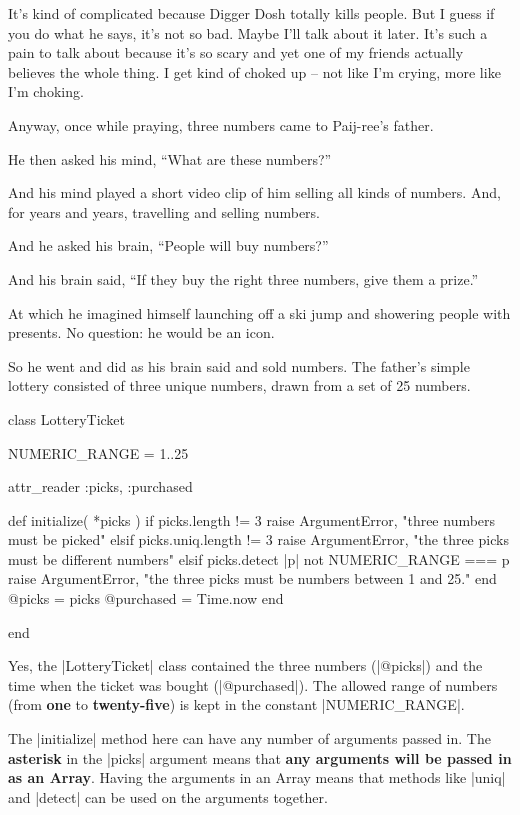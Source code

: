 \documentclass[12pt,twoside]{report}
\begin{document}
It's kind of complicated because Digger Dosh totally kills people.
But I guess if you do what he says, it's not so bad.  Maybe I'll talk
about it later.  It's such a pain to talk about because it's so scary
and yet one of my friends actually believes the whole thing.  I get
kind of choked up -- not like I'm crying, more like I'm choking.

Anyway, once while praying, three numbers came to Paij-ree's father.

He then asked his mind, ``What are these numbers?''

And his mind played a short video clip of him selling all kinds of
numbers.  And, for years and years, travelling and selling numbers.

And he asked his brain, ``People will buy numbers?''

And his brain said, ``If they buy the right three numbers, give them a
prize.''

At which he imagined himself launching off a ski jump and showering
people with presents.  No question: he would be an icon.

So he went and did as his brain said and sold numbers.  The father's
simple lottery consisted of three unique numbers, drawn from a set of
25 numbers.


\begin{rubycode}

 class LotteryTicket

   NUMERIC_RANGE = 1..25

   attr_reader :picks, :purchased

   def initialize( *picks )
     if picks.length != 3
       raise ArgumentError, "three numbers must be picked"
     elsif picks.uniq.length != 3
       raise ArgumentError, "the three picks must be different numbers"
     elsif picks.detect { |p| not NUMERIC_RANGE === p }
       raise ArgumentError, "the three picks must be numbers between 1 and 25."
     end
     @picks = picks
     @purchased = Time.now
   end

 end

\end{rubycode}


Yes, the \rubyinline|LotteryTicket| class contained
the three numbers (\rubyinline|@picks|) and the time
when the ticket was bought (\rubyinline|@purchased|).
The allowed range of numbers (from {\bf one} to {\bf twenty-five}) is
kept in the constant \rubyinline|NUMERIC_RANGE|.

The \rubyinline|initialize| method here can have any
number of arguments passed in.  The {\bf asterisk} in the
\rubyinline|picks| argument means that {\bf any
  arguments will be passed in as an Array}.  Having the arguments in
an Array means that methods like \rubyinline|uniq| and
\rubyinline|detect| can be used on the arguments
together.
\end{document}
